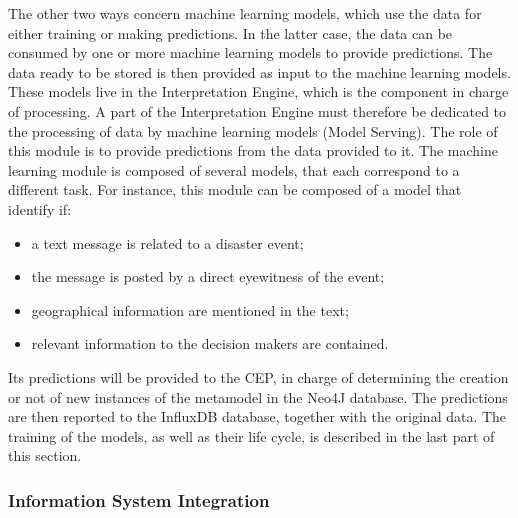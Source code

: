 The other two ways concern machine learning models, which use the data for either training or making predictions.
In the latter case, the data can be consumed by one or more machine learning models to provide predictions.
The data ready to be stored is then provided as input to the machine learning models.
These models live in the Interpretation Engine, which is the component in charge of processing.
A part of the Interpretation Engine must therefore be dedicated to the processing of data by machine learning models (Model Serving).
The role of this module is to provide predictions from the data provided to it.
The machine learning module is composed of several models, that each correspond to a different task.
For instance, this module can be composed of a model that identify if:

\begin{itemize}
    \item a text message is related to a disaster event;
    \item the message is posted by a direct eyewitness of the event;
    \item geographical information are mentioned in the text;
    \item relevant information to the decision makers are contained.
\end{itemize}

Its predictions will be provided to the CEP, in charge of determining the creation or not of new instances of the metamodel in the Neo4J database.
The predictions are then reported to the InfluxDB database, together with the original data.
The training of the models, as well as their life cycle, is described in the last part of this section.

\subsubsection{Information System Integration}
